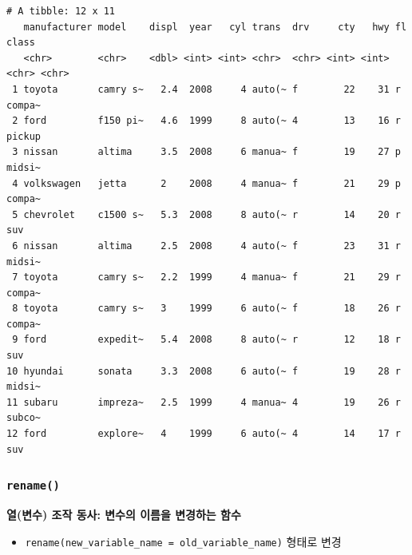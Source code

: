 \documentclass[
  11pt,
]{krantz}
\makeatletter
\newenvironment{Shaded}{\begin{snugshade}}{\end{snugshade}}
\newcommand{\CommentTok}[1]{\textcolor[rgb]{0.37,0.37,0.37}{\textit{#1}}}
\newcommand{\DataTypeTok}[1]{\textcolor[rgb]{0.27,0.27,0.27}{#1}}
\newcommand{\DecValTok}[1]{\textcolor[rgb]{0.06,0.06,0.06}{#1}}
\newcommand{\KeywordTok}[1]{\textcolor[rgb]{0.27,0.27,0.27}{\textbf{#1}}}
\newcommand{\NormalTok}[1]{#1}
\newcommand{\OperatorTok}[1]{\textcolor[rgb]{0.43,0.43,0.43}{\textbf{#1}}}
\newcommand{\StringTok}[1]{\textcolor[rgb]{0.5,0.5,0.5}{#1}}
\providecommand{\tightlist}{%
  \setlength{\itemsep}{0pt}\setlength{\parskip}{0pt}}
\newenvironment{kframe}{%
\medskip{}
\setlength{\fboxsep}{.8em}
 \def\at@end@of@kframe{}%
 \ifinner\ifhmode%
  \def\at@end@of@kframe{\end{minipage}}%
  \begin{minipage}{\columnwidth}%
 \fi\fi%
 \def\FrameCommand##1{\hskip\@totalleftmargin \hskip-\fboxsep
 \colorbox{shadecolor}{##1}\hskip-\fboxsep
     \hskip-\linewidth \hskip-\@totalleftmargin \hskip\columnwidth}%
 \MakeFramed {\advance\hsize-\width
   \@totalleftmargin\z@ \linewidth\hsize
   \@setminipage}}%
 {\par\unskip\endMakeFramed%
 \at@end@of@kframe}
\renewenvironment{quote}{\begin{kframe}}{\end{kframe}}
\makeatother
\begin{document}
\begin{verbatim}
# A tibble: 12 x 11
   manufacturer model    displ  year   cyl trans  drv     cty   hwy fl    class 
   <chr>        <chr>    <dbl> <int> <int> <chr>  <chr> <int> <int> <chr> <chr> 
 1 toyota       camry s~   2.4  2008     4 auto(~ f        22    31 r     compa~
 2 ford         f150 pi~   4.6  1999     8 auto(~ 4        13    16 r     pickup
 3 nissan       altima     3.5  2008     6 manua~ f        19    27 p     midsi~
 4 volkswagen   jetta      2    2008     4 manua~ f        21    29 p     compa~
 5 chevrolet    c1500 s~   5.3  2008     8 auto(~ r        14    20 r     suv   
 6 nissan       altima     2.5  2008     4 auto(~ f        23    31 r     midsi~
 7 toyota       camry s~   2.2  1999     4 manua~ f        21    29 r     compa~
 8 toyota       camry s~   3    1999     6 auto(~ f        18    26 r     compa~
 9 ford         expedit~   5.4  2008     8 auto(~ r        12    18 r     suv   
10 hyundai      sonata     3.3  2008     6 auto(~ f        19    28 r     midsi~
11 subaru       impreza~   2.5  1999     4 manua~ 4        19    26 r     subco~
12 ford         explore~   4    1999     6 auto(~ 4        14    17 r     suv   
\end{verbatim}

\normalsize

\hypertarget{dplyr-rename}{%
\subsubsection*{\texorpdfstring{\texttt{rename()}}{rename()}}\label{dplyr-rename}}


\begin{quote}
\textbf{열(변수) 조작 동사: 변수의 이름을 변경하는 함수}
\end{quote}

\begin{itemize}
\tightlist
\item
  \texttt{rename(new\_variable\_name\ =\ old\_variable\_name)} 형태로 변경
\end{itemize}

\footnotesize

\begin{Shaded}
\end{Shaded}
\end{document}
